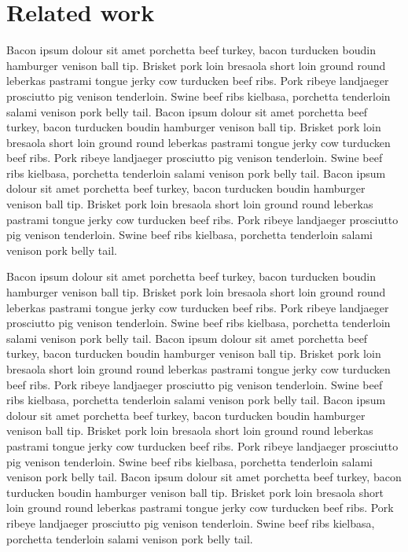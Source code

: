 \chapter{Related work}

Bacon ipsum dolour sit amet porchetta beef turkey, bacon turducken boudin hamburger venison ball tip. Brisket pork loin bresaola short loin ground round leberkas pastrami tongue jerky cow turducken beef ribs. Pork ribeye landjaeger prosciutto pig venison tenderloin. Swine beef ribs kielbasa, porchetta tenderloin salami venison pork belly tail.
Bacon ipsum dolour sit amet porchetta beef turkey, bacon turducken boudin hamburger venison ball tip. Brisket pork loin bresaola short loin ground round leberkas pastrami tongue jerky cow turducken beef ribs. Pork ribeye landjaeger prosciutto pig venison tenderloin. Swine beef ribs kielbasa, porchetta tenderloin salami venison pork belly tail.
Bacon ipsum dolour sit amet porchetta beef turkey, bacon turducken boudin hamburger venison ball tip. Brisket pork loin bresaola short loin ground round leberkas pastrami tongue jerky cow turducken beef ribs. Pork ribeye landjaeger prosciutto pig venison tenderloin. Swine beef ribs kielbasa, porchetta tenderloin salami venison pork belly tail.

Bacon ipsum dolour sit amet porchetta beef turkey, bacon turducken boudin hamburger venison ball tip. Brisket pork loin bresaola short loin ground round leberkas pastrami tongue jerky cow turducken beef ribs. Pork ribeye landjaeger prosciutto pig venison tenderloin. Swine beef ribs kielbasa, porchetta tenderloin salami venison pork belly tail.
Bacon ipsum dolour sit amet porchetta beef turkey, bacon turducken boudin hamburger venison ball tip. Brisket pork loin bresaola short loin ground round leberkas pastrami tongue jerky cow turducken beef ribs. Pork ribeye landjaeger prosciutto pig venison tenderloin. Swine beef ribs kielbasa, porchetta tenderloin salami venison pork belly tail.
Bacon ipsum dolour sit amet porchetta beef turkey, bacon turducken boudin hamburger venison ball tip. Brisket pork loin bresaola short loin ground round leberkas pastrami tongue jerky cow turducken beef ribs. Pork ribeye landjaeger prosciutto pig venison tenderloin. Swine beef ribs kielbasa, porchetta tenderloin salami venison pork belly tail.
Bacon ipsum dolour sit amet porchetta beef turkey, bacon turducken boudin hamburger venison ball tip. Brisket pork loin bresaola short loin ground round leberkas pastrami tongue jerky cow turducken beef ribs. Pork ribeye landjaeger prosciutto pig venison tenderloin. Swine beef ribs kielbasa, porchetta tenderloin salami venison pork belly tail.


